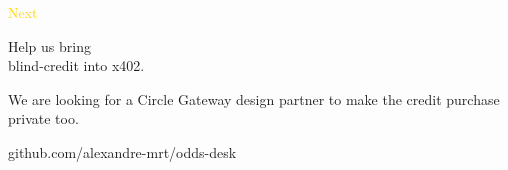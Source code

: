 \documentclass[aspectratio=169,12pt]{beamer}
\newcommand{\eyebrow}[1]{{\ttfamily\textcolor{gold}{#1}}\par\smallskip}
\begin{document}
\begin{frame}
  \vspace{0.8cm}
  \eyebrow{Next}
  {\pixel\fontsize{28}{34}\selectfont\color{sand} Help us bring\\ blind-credit into x402.\par}
  \bigskip
  {\large We are looking for a Circle Gateway design partner to make the credit purchase private too.\par}
  \vfill
  {\ttfamily\textcolor{sand}{github.com/alexandre-mrt/odds-desk}}
  \vspace{0.9cm}
\end{frame}
\end{document}
